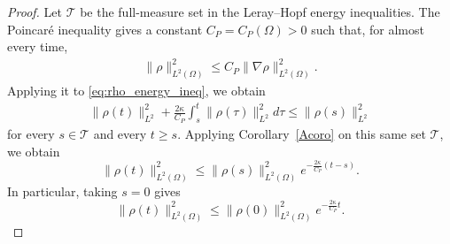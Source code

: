 \documentclass[10pt,a4paper]{amsart}
\begin{document}
\begin{proof}
Let $\mathcal T$ be the full-measure set in the Leray--Hopf energy inequalities. The Poincar\'e inequality gives a constant $C_P=C_P(\Omega)>0$ such that, for almost every time,
\begin{equation}
    \begin{split}
        \|\rho\|^2_{L^2(\Omega)}\le C_P\|\nabla\rho\|^2_{L^2(\Omega)}.
    \end{split}
\end{equation} 
Applying it to \eqref{eq:rho_energy_ineq}, we obtain 
\begin{equation}
   \begin{split}
      \|\rho(t)\|^2_{L^2}+\frac{2\kappa}{C_P}\int_s^t\|\rho(\tau)\|^2_{L^2}d\tau\le \|\rho(s)\|^2_{L^2}
   \end{split}
\end{equation}
for every $s\in\mathcal T$ and every $t\ge s$. 
Applying Corollary~\ref{Acoro} on this same set $\mathcal T$, we obtain
\begin{equation}\label{rho1}
    \|\rho(t)\|^2_{L^2(\Omega)}\le\|\rho(s)\|^2_{L^2(\Omega)}e^{-\frac{2\kappa}{C_P}(t-s)}.
\end{equation}
In particular, taking $s=0$ gives
\begin{equation}\label{rho2}
    \|\rho(t)\|^2_{L^2(\Omega)}\le\|\rho(0)\|^2_{L^2(\Omega)}e^{-\frac{2\kappa}{C_P}t}.
\end{equation}


\end{proof}
\end{document}
